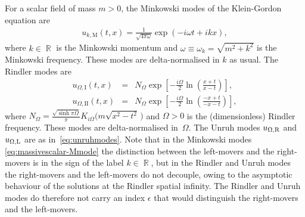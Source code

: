 For a scalar field of mass $m>0$, the 
Minkowski modes of the Klein-Gordon equation are
\begin{align}
\label{eq:massivescalar-Mmode}
u_{k,\text{M}} (t,x) = \frac{1}{\sqrt{4\pi \omega}}\exp(-i\omega t + i kx),
\end{align}
where $k\in\BbbR$ is the Minkowski momentum and $\omega \equiv \omega_k =\sqrt{m^2+k^2}$ is the Minkowski frequency. 
These modes are delta-normalised in $k$ as usual. 
The Rindler modes are \cite{Takagi}
\begin{eqnarray}
u_{\Omega,\text{I}} (t,x) &=& N_{\Omega}\exp\left[ -\frac{i\Omega}{2}\ln\left(\frac{x+t}{x-t}\right)\right],\nonumber \\
u_{\Omega,\text{II}} (t,x) &=& N_{\Omega}\exp\left[ -\frac{i\Omega}{2}\ln\left(\frac{-x+t}{-x-t}\right)\right],
\end{eqnarray}
where $N_{\Omega}= \frac{\sqrt{\sinh \pi\Omega}}{\pi}K_{i\Omega}\bigl(m \sqrt{x^2-t^2}\,\bigr)$ and 
$\Omega>0$ is the (dimensionless) Rindler frequency. These modes are delta-normalised in~$\Omega$. 
The Unruh modes $u_{\Omega,\text{\text{R}}}$ and $u_{\Omega,\text{\text{L}}}$ 
are as in~\eqref{eq:unruhmodes}. 
Note that in the Minkowski modes \eqref{eq:massivescalar-Mmode}
the distinction between 
the left-movers and the right-movers is in the sign of the label 
$k\in\BbbR$, but in the Rindler and Unruh modes the right-movers and the left-movers 
do not decouple, owing to the 
asymptotic behaviour of the solutions at the Rindler spatial infinity. 
The Rindler and Unruh modes do therefore not carry an index $\epsilon$ 
that would distinguish the right-movers and the left-movers. 

